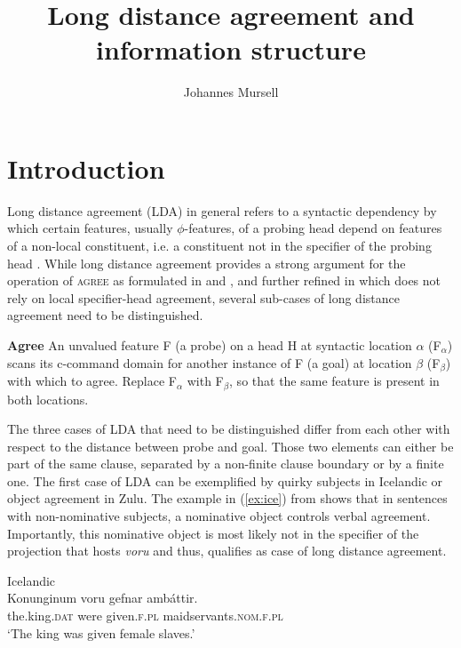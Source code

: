 \documentclass[output=paper
,modfonts
,nonflat]{langsci/langscibook}
\title{Long distance agreement and information structure}
\author{%
 Johannes Mursell\affiliation{Goethe University Frankfurt}
}
\begin{document}
\maketitle

\section{Introduction} 
Long distance agreement (LDA) in general refers to a syntactic dependency by which certain features, usually $ \phi $-features, of a probing head depend on features of a non-local constituent, i.e. a constituent not in the specifier of the probing head \citep{Bhatt_Keine2016}. While long distance agreement provides a strong argument for the operation of \textsc{agree} as formulated in \citet{Chomsky2000} and \citet{Chomsky2001}, and further refined in \citet{Pesetsky_Torrego2007} which does not rely on local specifier-head agreement, several sub-cases of long distance agreement need to be distinguished.
\begin{exe} 
\ex \label{def:agr_pt} \textbf{Agree} \citep[][268]{Pesetsky_Torrego2007}
	\xlist
	\ex An unvalued feature F (a probe) on a head H at syntactic location $\alpha$ (F$_{\alpha}$) scans its c-command domain for another instance of F (a goal) at location $\beta$ (F$_{\beta}$) with which to agree. 
	\ex Replace F$_{\alpha}$ with F$_{\beta}$, so that the same feature is present in both locations.
	\endxlist
\end{exe}
The three cases of LDA that need to be distinguished differ from each other with respect to the distance between probe and goal. Those two elements can either be part of the same clause, separated by a non-finite clause boundary or by a finite one. The first case of LDA can be exemplified by quirky subjects in Icelandic or object agreement in Zulu. The example in (\ref{ex:ice}) from \citet{Zaenen_et_al1985} shows that in sentences with non-nominative subjects, a nominative object controls verbal agreement. Importantly, this nominative object is most likely not in the specifier of the projection that hosts \textit{voru} and thus, qualifies as case of long distance agreement.
\begin{exe} 
\ex Icelandic \citep[][460]{Zaenen_et_al1985}\label{ex:ice}\\ 
	\gll Konunginum voru gefnar amb\'{a}ttir.\\
	 the.king.\textsc{dat} were given.\textsc{f.pl} maidservants.\textsc{nom.f.pl}\\
	\glt `The king was given female slaves.'
\end{exe}
\end{document}

